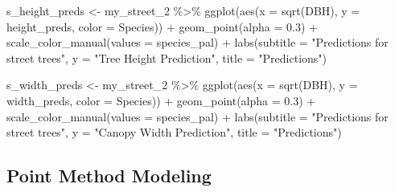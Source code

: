 \documentclass[12pt,twoside]{reedthesis}
\newenvironment{Shaded}{\begin{snugshade}}{\end{snugshade}}
\newcommand{\AttributeTok}[1]{\textcolor[rgb]{0.77,0.63,0.00}{#1}}
\newcommand{\FloatTok}[1]{\textcolor[rgb]{0.00,0.00,0.81}{#1}}
\newcommand{\FunctionTok}[1]{\textcolor[rgb]{0.00,0.00,0.00}{#1}}
\newcommand{\NormalTok}[1]{#1}
\newcommand{\OtherTok}[1]{\textcolor[rgb]{0.56,0.35,0.01}{#1}}
\newcommand{\SpecialCharTok}[1]{\textcolor[rgb]{0.00,0.00,0.00}{#1}}
\newcommand{\StringTok}[1]{\textcolor[rgb]{0.31,0.60,0.02}{#1}}
\begin{document}
\begin{Shaded}
\begin{Highlighting}[]
\NormalTok{s\_height\_preds }\OtherTok{\textless{}{-}}\NormalTok{ my\_street\_2 }\SpecialCharTok{\%\textgreater{}\%}
    \FunctionTok{ggplot}\NormalTok{(}\FunctionTok{aes}\NormalTok{(}\AttributeTok{x =} \FunctionTok{sqrt}\NormalTok{(DBH), }\AttributeTok{y =}\NormalTok{ height\_preds, }\AttributeTok{color =}\NormalTok{ Species)) }\SpecialCharTok{+}
    \FunctionTok{geom\_point}\NormalTok{(}\AttributeTok{alpha =} \FloatTok{0.3}\NormalTok{) }\SpecialCharTok{+} \FunctionTok{scale\_color\_manual}\NormalTok{(}\AttributeTok{values =}\NormalTok{ species\_pal) }\SpecialCharTok{+}
    \FunctionTok{labs}\NormalTok{(}\AttributeTok{subtitle =} \StringTok{"Predictions for street trees"}\NormalTok{, }\AttributeTok{y =} \StringTok{"Tree Height Prediction"}\NormalTok{,}
        \AttributeTok{title =} \StringTok{"Predictions"}\NormalTok{)}

\NormalTok{s\_width\_preds }\OtherTok{\textless{}{-}}\NormalTok{ my\_street\_2 }\SpecialCharTok{\%\textgreater{}\%}
    \FunctionTok{ggplot}\NormalTok{(}\FunctionTok{aes}\NormalTok{(}\AttributeTok{x =} \FunctionTok{sqrt}\NormalTok{(DBH), }\AttributeTok{y =}\NormalTok{ width\_preds, }\AttributeTok{color =}\NormalTok{ Species)) }\SpecialCharTok{+}
    \FunctionTok{geom\_point}\NormalTok{(}\AttributeTok{alpha =} \FloatTok{0.3}\NormalTok{) }\SpecialCharTok{+} \FunctionTok{scale\_color\_manual}\NormalTok{(}\AttributeTok{values =}\NormalTok{ species\_pal) }\SpecialCharTok{+}
    \FunctionTok{labs}\NormalTok{(}\AttributeTok{subtitle =} \StringTok{"Predictions for street trees"}\NormalTok{, }\AttributeTok{y =} \StringTok{"Canopy Width Prediction"}\NormalTok{,}
        \AttributeTok{title =} \StringTok{"Predictions"}\NormalTok{)}
\end{Highlighting}
\end{Shaded}
\hypertarget{point-method-modeling}{%
\subsection*{Point Method Modeling}\label{point-method-modeling}}
\end{document}
